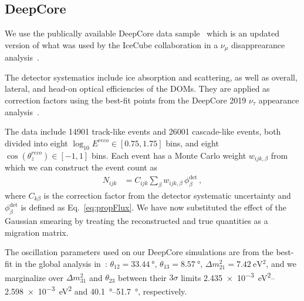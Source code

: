 \documentclass[draft=True]{revtex4-2}
\newcommand{\zreco}{\ensuremath{\cos{(\theta_z^{reco})}}}
\newcommand{\dm}{\Delta m^2_{31}}
\begin{document}
\subsection{DeepCore}\label{ch:DCmethod}
We use the publically available DeepCore data sample~\cite{DC2019data} which is an updated version of what was used by the 
IceCube collaboration in a $\nu_\mu$ disapprearance analysis~\cite{DC2018mudisappearance}.

The detector systematics include ice absorption and scattering, as well as overall, lateral, and head-on optical efficiencies of the DOMs. 
They are applied as correction factors using the best-fit points from the DeepCore 2019 $\nu_\tau$ appearance 
analysis~\cite{DC2019tauappearance}.

The data include 14901 track-like events and 26001 cascade-like events, both divided into eight 
$ \log_{10}E^{reco} \in [0.75,1.75]$ bins, and eight $\zreco \in [-1,1]$ bins. Each event has a Monte Carlo weight $w_{ijk,\beta}$
from which we can construct the event count as
\begin{align}\label{eq:MCevents}
    N_{ijk} &= C_{ijk}\sum_{\beta}w_{ijk,\beta}\, \phi_\beta^\text{det}\,,
\end{align}
where $C_{k\beta}$ is the correction factor from the detector systematic uncertainty and $\phi_\beta^\text{det}$ is defined as Eq.~\ref{eq:propFlux}. We have now substituted the effect of the Gaussian smearing 
by treating the reconstructed and true quantities as a migration matrix. 

The oscillation parameters used on our DeepCore simulations are from the
best-fit in the global analysis in~\cite{nufit}: $\theta_{12} = \SI{33.44}{\degree},\, \theta_{13} = \SI{8.57}{\degree},\, \Delta m^2_{21} =  \SI{7.42}{\electronvolt^2}$, and we 
marginalize over $\dm$ and $\theta_{23}$ between their $3\sigma$ limits \SIrange{2.435e-3}{2.598e-3}{\eV \squared} and \SIrange{40.1}{51.7}{\degree}, respectively.

\end{document}
